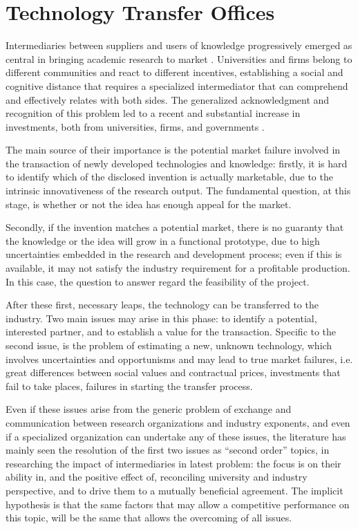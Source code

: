 \section{Technology Transfer Offices}

Intermediaries between suppliers and users of knowledge progressively emerged as central in bringing academic research to market \citep{Landry2013}. Universities and firms belong to different communities and react to different incentives, establishing a social and cognitive distance that requires a specialized intermediator that can comprehend and effectively relates with both sides. The generalized acknowledgment and recognition of this problem led to a recent and substantial increase in investments, both from universities, firms, and governments \citep{Muscio2010}.

The main source of their importance is the potential market failure involved in the transaction of newly developed technologies and knowledge: firstly, it is hard to identify which of the disclosed invention is actually marketable, due to the intrinsic innovativeness of the research output. The fundamental question, at this stage, is whether or not the idea has enough appeal for the market.

Secondly, if the invention matches a potential market, there is no guaranty that the knowledge or the idea will grow in a functional prototype, due to high uncertainties embedded in the research and development process; even if this is available, it may not satisfy the industry requirement for a profitable production. In this case, the question to answer regard the feasibility of the project.

After these first, necessary leaps, the technology can be transferred to the industry. Two main issues may arise in this phase: to identify a potential, interested partner, and to establish a value for the transaction. Specific to the second issue, is the problem of estimating a new, unknown technology, which involves uncertainties and opportunisms and may lead to true market failures, i.e. great differences between social values and contractual prices, investments that fail to take places, failures in starting the transfer process.

Even if these issues arise from the generic problem of exchange and communication between research organizations and industry exponents, and even if a specialized organization can undertake any of these issues, the literature has mainly seen the resolution of the first two issues as \enquote{second order} topics, in researching the impact of intermediaries in latest problem: the focus is on their ability in, and the positive effect of, reconciling university and industry perspective, and to drive them to a mutually beneficial agreement. The implicit hypothesis is that the same factors that may allow a competitive performance on this topic, will be the same that allows the overcoming of all issues.

